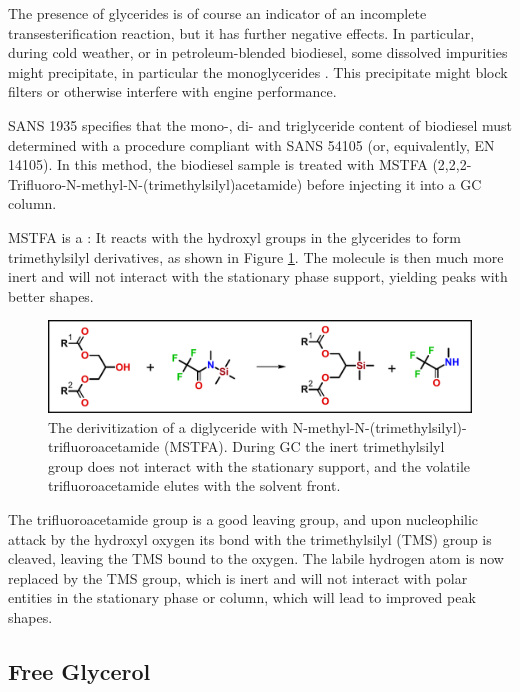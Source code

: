 The presence of glycerides is of course an indicator of an incomplete
transesterification reaction, but it has further negative effects. In
particular, during cold weather, or in petroleum-blended biodiesel, some
dissolved impurities might precipitate, in particular the monoglycerides
\autocite{Dunn2009,Plata2015}. This precipitate might block filters or otherwise
interfere with engine performance.

SANS 1935 specifies that the mono-, di- and triglyceride content of biodiesel
must determined with a procedure compliant with SANS 54105 (or, equivalently, EN
14105). In this method, the biodiesel sample is treated with MSTFA
(2,2,2-Trifluoro-N-methyl-N-(trimethylsilyl)acetamide) before injecting it into
a GC column.

MSTFA is a : It reacts with the hydroxyl groups
in the glycerides to form trimethylsilyl derivatives, as shown in Figure
\ref{fig:MSTFA}. The molecule is then much more inert and will not interact with
the stationary phase support, yielding peaks with better shapes.

\begin{figure}
\centering
\includegraphics[width=\textwidth]{Figures/Derivitization.pdf}
\decoRule

\caption[Derivitization]{The derivitization of a diglyceride with
N-methyl-N-(trimethylsilyl)-trifluoroacetamide (MSTFA). During GC the inert
trimethylsilyl group does not interact with the stationary support,
and the volatile trifluoroacetamide elutes with the solvent front.}

\label{fig:MSTFA}
\end{figure}

The trifluoroacetamide group is a good leaving group, and upon nucleophilic
attack by the hydroxyl oxygen its bond with the trimethylsilyl (TMS) group is cleaved,
leaving the TMS bound to the oxygen. The labile hydrogen atom is now replaced by
the TMS group, which is inert and will not interact with polar entities in the
stationary phase or column, which will lead to improved peak shapes. 

\subsection{Free Glycerol}

